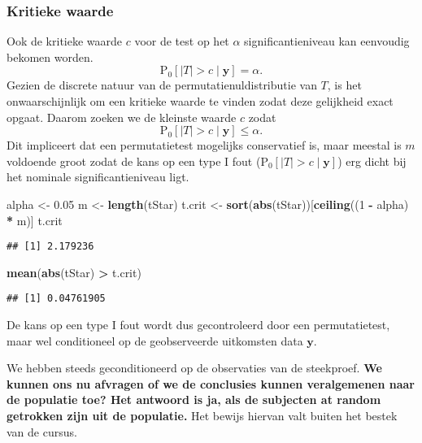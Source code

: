 \documentclass[12pt,dutch,coursenotes]{book}
\newenvironment{Shaded}{\begin{snugshade}}{\end{snugshade}}
\newcommand{\KeywordTok}[1]{\textcolor[rgb]{0.13,0.29,0.53}{\textbf{#1}}}
\newcommand{\DecValTok}[1]{\textcolor[rgb]{0.00,0.00,0.81}{#1}}
\newcommand{\FloatTok}[1]{\textcolor[rgb]{0.00,0.00,0.81}{#1}}
\newcommand{\StringTok}[1]{\textcolor[rgb]{0.31,0.60,0.02}{#1}}
\newcommand{\OperatorTok}[1]{\textcolor[rgb]{0.81,0.36,0.00}{\textbf{#1}}}
\newcommand{\NormalTok}[1]{#1}
\theoremstyle{definition}
\theoremstyle{definition}
\theoremstyle{definition}
\theoremstyle{remark}
\begin{document}
\subsubsection{Kritieke waarde}\label{kritieke-waarde-1}

Ook de kritieke waarde \(c\) voor de test op het \(\alpha\)
significantieniveau kan eenvoudig bekomen worden. \[
   \text{P}_0\left[\vert T\vert> c \mid \mathbf{y}\right] =\alpha. 
 \] Gezien de discrete natuur van de permutatienuldistributie van \(T\),
is het onwaarschijnlijk om een kritieke waarde te vinden zodat deze
gelijkheid exact opgaat. Daarom zoeken we de kleinste waarde \(c\) zodat
\[
   \text{P}_0\left[\vert T\vert> c \mid \mathbf{y}\right]  \leq \alpha. 
 \] Dit impliceert dat een permutatietest mogelijks conservatief is,
maar meestal is \(m\) voldoende groot zodat de kans op een type I fout
(\(\text{P}_{0}\left[ \vert T \vert > c \mid \mathbf{y}\right]\)) erg
dicht bij het nominale significantieniveau ligt.

\begin{Shaded}
\begin{Highlighting}[]
\NormalTok{alpha <-}\StringTok{ }\FloatTok{0.05}
\NormalTok{m <-}\StringTok{ }\KeywordTok{length}\NormalTok{(tStar)}
\NormalTok{t.crit <-}\StringTok{ }\KeywordTok{sort}\NormalTok{(}\KeywordTok{abs}\NormalTok{(tStar))[}\KeywordTok{ceiling}\NormalTok{((}\DecValTok{1} \OperatorTok{-}\StringTok{ }\NormalTok{alpha) }\OperatorTok{*}\StringTok{ }\NormalTok{m)]}
\NormalTok{t.crit}
\end{Highlighting}
\end{Shaded}

\begin{verbatim}
## [1] 2.179236
\end{verbatim}

\begin{Shaded}
\begin{Highlighting}[]
\KeywordTok{mean}\NormalTok{(}\KeywordTok{abs}\NormalTok{(tStar) }\OperatorTok{>}\StringTok{ }\NormalTok{t.crit)}
\end{Highlighting}
\end{Shaded}

\begin{verbatim}
## [1] 0.04761905
\end{verbatim}

De kans op een type I fout wordt dus gecontroleerd door een
permutatietest, maar wel conditioneel op de geobserveerde uitkomsten
data \(\mathbf{y}\).

We hebben steeds geconditioneerd op de observaties van de steekproef.
\textbf{We kunnen ons nu afvragen of we de conclusies kunnen
veralgemenen naar de populatie toe? Het antwoord is ja, als de subjecten
at random getrokken zijn uit de populatie.} Het bewijs hiervan valt
buiten het bestek van de cursus.
\end{document}
